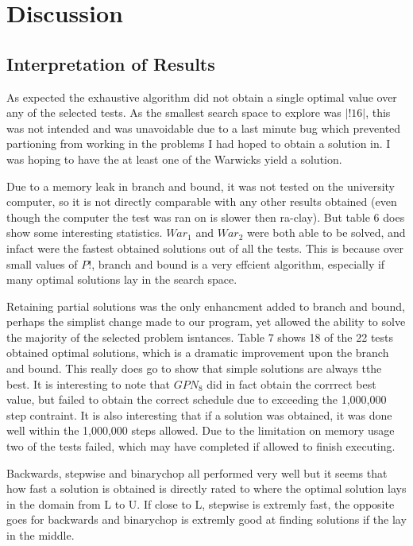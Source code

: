\section{Discussion}

\subsection{Interpretation of Results} 

As expected the exhaustive algorithm did not obtain a single optimal value over
any of the selected tests. As the smallest search space to explore was $|!16|$,
this was not intended and was unavoidable due to a last minute bug which
prevented partioning from working in the problems I had hoped to obtain a solution in. I was hoping to have the at least one of the
Warwicks yield a solution.

Due to a memory leak in branch and bound, it was not tested on the university
computer, so it is not directly comparable with any other results obtained
(even though the computer the test was ran on is slower then ra-clay).
But table 6 does show some interesting statistics. $War_1$ and
$War_2$ were both able to be solved, and infact were the fastest obtained
solutions out of all the tests. This is because over small values of $P!$,
branch and bound is a very effcient algorithm, especially if many optimal
solutions lay in the search space.

Retaining partial solutions was the only enhancment added to branch and bound,
perhaps the simplist change made to our program, yet allowed the ability to
solve the majority of the selected problem isntances.  Table 7 shows 18 of the
22 tests obtained optimal solutions, which is a dramatic improvement upon the
branch and bound. This really does go to show that simple solutions are always
tthe best. It is interesting to note that $GPN_8$ did in fact obtain the
corrrect best value, but failed to obtain the correct schedule due to exceeding
the 1,000,000 step contraint. It is also interesting that if a solution was
obtained, it was done well within the 1,000,000 steps allowed.  Due to the
limitation on memory usage two of the tests failed, which may have completed if
allowed to finish executing.

Backwards, stepwise and binarychop all performed very well but it seems that
how fast a solution is obtained is directly rated to where the optimal solution
lays in the domain from L to U. If close to L, stepwise is extremly fast, the
opposite goes for backwards and binarychop is extremly good at finding
solutions if the lay in the middle.

